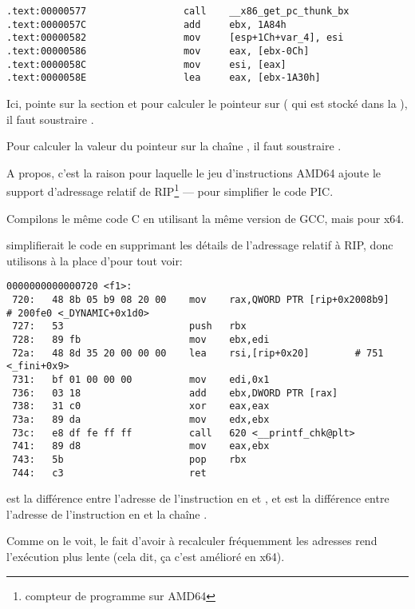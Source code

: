 \begin{lstlisting}
.text:00000577                 call    __x86_get_pc_thunk_bx
.text:0000057C                 add     ebx, 1A84h
.text:00000582                 mov     [esp+1Ch+var_4], esi
.text:00000586                 mov     eax, [ebx-0Ch]
.text:0000058C                 mov     esi, [eax]
.text:0000058E                 lea     eax, [ebx-1A30h]
\end{lstlisting}

Ici, \EBX pointe sur la section  et pour calculer le pointeur sur \globvar{} ( qui est stocké dans
la ), il faut soustraire .

Pour calculer la valeur du pointeur sur la chaîne \retstring{}, il faut soustraire .


A propos, c'est la raison pour laquelle le jeu d'instructions AMD64 ajoute le support d'adressage relatif de RIP\footnote{compteur de programme sur AMD64} --- pour simplifier le code PIC.

Compilons le même code C en utilisant la même version de GCC, mais pour x64.

\IDA simplifierait le code en supprimant les détails de l'adressage relatif à RIP,
donc utilisons  à la place d'\IDA pour tout voir:

\begin{lstlisting}
0000000000000720 <f1>:
 720:	48 8b 05 b9 08 20 00 	mov    rax,QWORD PTR [rip+0x2008b9]        # 200fe0 <_DYNAMIC+0x1d0>
 727:	53                   	push   rbx
 728:	89 fb                	mov    ebx,edi
 72a:	48 8d 35 20 00 00 00 	lea    rsi,[rip+0x20]        # 751 <_fini+0x9>
 731:	bf 01 00 00 00       	mov    edi,0x1
 736:	03 18                	add    ebx,DWORD PTR [rax]
 738:	31 c0                	xor    eax,eax
 73a:	89 da                	mov    edx,ebx
 73c:	e8 df fe ff ff       	call   620 <__printf_chk@plt>
 741:	89 d8                	mov    eax,ebx
 743:	5b                   	pop    rbx
 744:	c3                   	ret    
\end{lstlisting}

 est la différence entre l'adresse de l'instruction en  et \globvar{}, et 
 est la différence entre l'adresse de l'instruction en
 et la chaîne \retstring{}.

Comme on le voit, le fait d'avoir à recalculer fréquemment les adresses rend l'exécution plus lente
(cela dit, ça c'est amélioré en x64).

